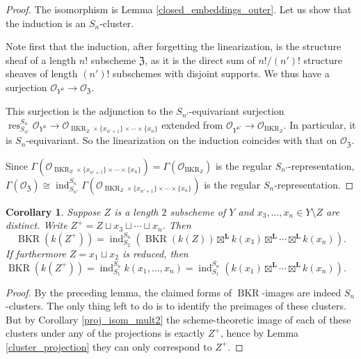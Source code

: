 \documentclass{amsart}
\theoremstyle{plain}
\newtheorem{corollary}[theorem]{Corollary}
\theoremstyle{definition}
\theoremstyle{remark}
\begin{document}
    \begin{proof}
        The isomorphism is Lemma \ref{closed_embeddings_outer}.
        Let us show that the induction is an $S_n$-cluster.

        Note first that the induction, after forgetting the linearization, is the structure sheaf of a length $n!$ subscheme $\mathfrak Z$, as it is the direct sum of $n!/(n')!$ structure sheaves of length $(n')!$ subschemes with disjoint supports.
        We thus have a surjection $\mathcal O_{Y^n}\to\mathcal O_{\mathfrak Z}$.

        This surjection is the adjunction to the $S_{n'}$-equivariant surjection $\operatorname{res}_{S_{n'}}^{S_n}\mathcal O_{Y^n}\to \mathcal O_{\operatorname{BKR}_Z\times \{x_{n'+1}\}\times \cdots\times\{x_n\}}$ extended from $\mathcal O_{Y^{n'}}\to\mathcal O_{\operatorname{BKR}_Z}$.
        In particular, it is $S_n$-equivariant.
        So the linearization on the induction coincides with that on $\mathcal O_{\mathfrak Z}$.

        Since $\Gamma(\mathcal O_{\operatorname{BKR}_Z\times \{x_{n'+1}\}\times \cdots\times\{x_n\}})=\Gamma(\mathcal O_{\operatorname{BKR}_Z})$ is the regular $S_{n'}$-representation, $\Gamma(\mathcal O_{\mathfrak Z})\cong\operatorname{ind}_{S_{n'}}^{S_n}\Gamma(\mathcal O_{\operatorname{BKR}_Z\times \{x_{n'+1}\}\times \cdots\times\{x_n\}})$ is the regular $S_n$-representation.
    \end{proof}
    \begin{corollary}
        Suppose $Z$ is a length $2$ subscheme of $Y$ and $x_3,\ldots,x_n\in Y\setminus Z$ are distinct.
        Write $Z^+=Z\sqcup x_3\sqcup\cdots\sqcup x_n$.
        Then
        \[\operatorname{BKR}(k(Z^+))=\operatorname{ind}_{S_2}^{S_n}(\operatorname{BKR}(k(Z))\boxtimes^{\mathbf L} k(x_3)\boxtimes^{\mathbf L}\cdots\boxtimes^{\mathbf L} k(x_n)).\]
        If furthermore $Z=x_1\sqcup x_2$ is reduced, then $\operatorname{BKR}(k(Z^+))=\operatorname{ind}_{S_1}^{S_n}k(x_1,\ldots,x_n)=\operatorname{ind}_{S_1}^{S_n}(k(x_1)\boxtimes^{\mathbf L}\cdots\boxtimes^{\mathbf L} k(x_n))$.
    \end{corollary}
    \begin{proof}
        By the preceding lemma, the claimed forms of $\operatorname{BKR}$-images are indeed $S_n$-clusters.
        The only thing left to do is to identify the preimages of these clusters.
        But by Corollary \ref{proj_isom_mult2} the scheme-theoretic image of each of these clusters under any of the projections is exactly $Z^+$, hence by Lemma \ref{cluster_projection} they can only correspond to $Z^+$.
    \end{proof}
\end{document}
